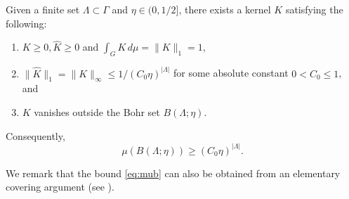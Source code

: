 \begin{lemma}
\label{lem:kernel_a}
    Given a finite set $\Lambda \subset \Gamma$ and $\eta \in (0, 1/2]$, there exists a kernel $K$ satisfying the following:
    \begin{enumerate}
        \item $K \geq 0, \widehat{K} \geq 0$ and $\int_G K \, d \mu = \lVert K \rVert_1 = 1$,
        \item $\lVert \widehat{K} \rVert_1 = \lVert K \rVert_{\infty} \leq 1/(C_0\eta)^{|\Lambda|}$ for some absolute constant $0 < C_0 \leq 1$, and         
        \item $K$ vanishes outside the Bohr set $B( \Lambda; \eta)$.
    \end{enumerate}
Consequently, 
\begin{equation} \label{eq:mub}
\mu(B( \Lambda; \eta)) \geq (C_0\eta)^{|\Lambda|}.
\end{equation} 
\end{lemma}
We remark that the bound \eqref{eq:mub} can also be obtained from an elementary covering argument (see \cite{tao}). 
